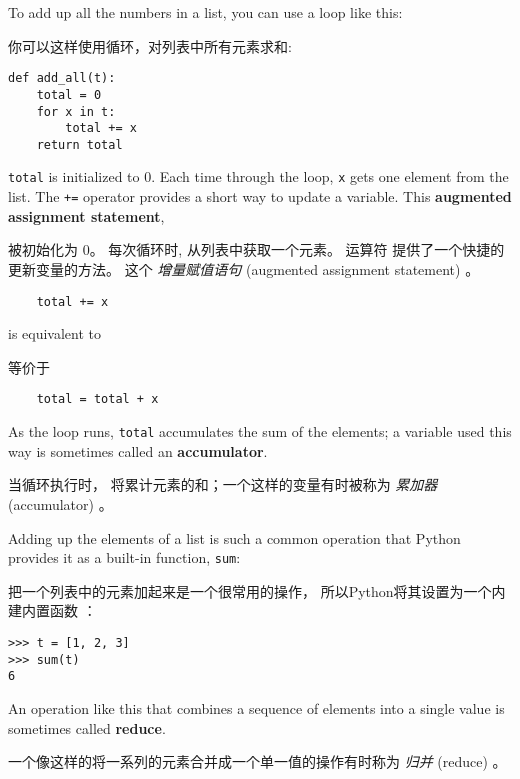To add up all the numbers in a list, you can use a loop like this:

你可以这样使用循环，对列表中所有元素求和:


\begin{lstlisting}
def add_all(t):
    total = 0
    for x in t:
        total += x
    return total
\end{lstlisting}
%
{\tt total} is initialized to 0.  Each time through the loop,
{\tt x} gets one element from the list.  The {\tt +=} operator
provides a short way to update a variable.  This {\bf augmented assignment statement},

 被初始化为 0。 每次循环时,  从列表中获取一个元素。
运算符 \li{+=} 提供了一个快捷的更新变量的方法。 这个 {\em 增量赋值语句} (augmented assignment statement) 。

  
  

\begin{lstlisting}
    total += x
\end{lstlisting}

%
is equivalent to

等价于

\begin{lstlisting}
    total = total + x
\end{lstlisting}
%
As the loop runs, {\tt total} accumulates the sum of the
elements; a variable used this way is sometimes called an
{\bf accumulator}.

当循环执行时， 将累计元素的和；一个这样的变量有时被称为 {\em 累加器} (accumulator) 。


Adding up the elements of a list is such a common operation
that Python provides it as a built-in function, {\tt sum}:

把一个列表中的元素加起来是一个很常用的操作，
所以Python将其设置为一个内建内置函数  ：

\begin{lstlisting}
>>> t = [1, 2, 3]
>>> sum(t)
6
\end{lstlisting}
%
An operation like this that combines a sequence of elements into
a single value is sometimes called {\bf reduce}.

一个像这样的将一系列的元素合并成一个单一值的操作有时称为 {\em 归并} (reduce) 。

  

